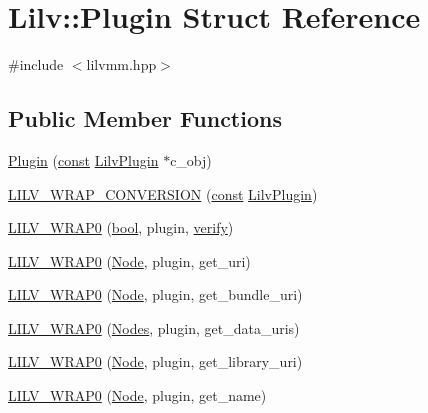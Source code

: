 \hypertarget{struct_lilv_1_1_plugin}{}\section{Lilv\+:\+:Plugin Struct Reference}
\label{struct_lilv_1_1_plugin}


{\ttfamily \#include $<$lilvmm.\+hpp$>$}

\subsection*{Public Member Functions}
\begin{DoxyCompactItemize}
\item 
\hyperlink{struct_lilv_1_1_plugin_a8f9d535bb3c658ee9b1306b047b3b565}{Plugin} (\hyperlink{getopt1_8c_a2c212835823e3c54a8ab6d95c652660e}{const} \hyperlink{lilv_8h_a94e36303167a78a0c392f881136b461b}{Lilv\+Plugin} $\ast$c\+\_\+obj)
\item 
\hyperlink{struct_lilv_1_1_plugin_ae95eb4515e50a7fb684f1baf3729bebd}{L\+I\+L\+V\+\_\+\+W\+R\+A\+P\+\_\+\+C\+O\+N\+V\+E\+R\+S\+I\+ON} (\hyperlink{getopt1_8c_a2c212835823e3c54a8ab6d95c652660e}{const} \hyperlink{lilv_8h_a94e36303167a78a0c392f881136b461b}{Lilv\+Plugin})
\item 
\hyperlink{struct_lilv_1_1_plugin_a176133320aa4c3751c24b300714462f4}{L\+I\+L\+V\+\_\+\+W\+R\+A\+P0} (\hyperlink{mac_2config_2i386_2lib-src_2libsoxr_2soxr-config_8h_abb452686968e48b67397da5f97445f5b}{bool}, plugin, \hyperlink{src_2flac_2main_8c_abedba2ce5fe0755d3b0144b916dd7070}{verify})
\item 
\hyperlink{struct_lilv_1_1_plugin_a9c2a63cc1b057b4e722d1bff4f4d0d77}{L\+I\+L\+V\+\_\+\+W\+R\+A\+P0} (\hyperlink{struct_lilv_1_1_node}{Node}, plugin, get\+\_\+uri)
\item 
\hyperlink{struct_lilv_1_1_plugin_af7597618292b495ece19a5d448475288}{L\+I\+L\+V\+\_\+\+W\+R\+A\+P0} (\hyperlink{struct_lilv_1_1_node}{Node}, plugin, get\+\_\+bundle\+\_\+uri)
\item 
\hyperlink{struct_lilv_1_1_plugin_a3716219353893c49a89286c3390e9424}{L\+I\+L\+V\+\_\+\+W\+R\+A\+P0} (\hyperlink{struct_lilv_1_1_nodes}{Nodes}, plugin, get\+\_\+data\+\_\+uris)
\item 
\hyperlink{struct_lilv_1_1_plugin_a6f37946caeabd71390f041e0438b9ba9}{L\+I\+L\+V\+\_\+\+W\+R\+A\+P0} (\hyperlink{struct_lilv_1_1_node}{Node}, plugin, get\+\_\+library\+\_\+uri)
\item 
\hyperlink{struct_lilv_1_1_plugin_aeb9dc17118fc1378f0c4f5b4095786e2}{L\+I\+L\+V\+\_\+\+W\+R\+A\+P0} (\hyperlink{struct_lilv_1_1_node}{Node}, plugin, get\+\_\+name)

\end{DoxyCompactItemize}
